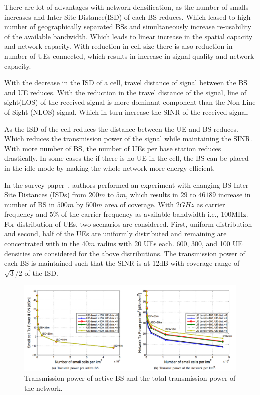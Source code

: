 \documentclass[12pt,onecolumn]{IEEEtran}
\begin{document}
There are lot of advantages with network densification, as the number of smalls increases and Inter Site Distance(ISD) of each BS reduces. Which leased to high number of geographically separated BSs and simultaneously increase re-usability of the available bandwidth. Which leads to linear increase in the spatial capacity and network capacity.
With reduction in cell size there is also reduction in number of UEs connected, which results in increase in signal quality and network capacity.

With the decrease in the ISD of a cell, travel distance of signal between the BS and UE reduces. With the reduction in the travel distance of the signal, line of sight(LOS) of the received signal is more dominant component than the Non-Line of Sight (NLOS) signal. Which in turn increase the SINR of the received signal.

As the ISD of the cell reduces the distance between the UE and BS reduces. Which reduces the transmission power of the signal while maintaining the SINR. With more number of BS, the number of UEs per base station reduces drastically. In some cases the if there is no UE in the cell, the BS can be placed in the idle mode by making the whole network more energy efficient.

In the survey paper~\cite{main_paper}, authors performed an experiment with changing BS Inter Site Distances (ISDs) from $200m$ to $5m$, which results in $29$ to $46189$ increase in number of BS in $500m$ by $500m$ area of coverage. With $2GHz$ as carrier frequency and $5\%$ of the carrier frequency as available bandwidth i.e., 100MHz. For distribution of UEs, two scenarios are considered. First, uniform distribution and second, half of the UEs are uniformly distributed and remaining are concentrated with in the $40m$ radius with 20 UEs each. 600, 300, and 100 UE densities are considered for the above distributions. The transmission power of each BS is maintained such that the SINR is at 12dB with coverage range of $\sqrt{3}/2$ of the ISD.

\begin{figure}[ht]
\includegraphics[scale=0.4]{tx_pow}
\centering
\caption{Transmission power of active BS and the total transmission power of the network.~\cite{main_paper}}
\label{fig:TXP}
\end{figure}
\end{document}
